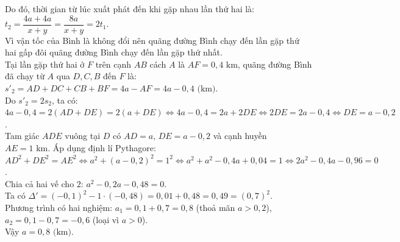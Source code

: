 \begin{bt}
{\begin{enumerate}[a)]
	Do đó, thời gian từ lúc xuất phát đến khi gặp nhau lần thứ hai là:
	$t_2 = \dfrac{4a + 4a}{x + y} = \dfrac{8a}{x + y} = 2t_1$.\\
	Vì vận tốc của Bình là không đổi nên quãng đường Bình chạy đến lần gặp thứ hai gấp đôi quãng đường Bình chạy đến lần gặp thứ nhất.\\
	Tại lần gặp thứ hai ở $F$ trên cạnh $AB$ cách $A$ là $AF = 0{,}4\text{ km}$, quãng đường Bình đã chạy từ $A$ qua $D, C, B$ đến $F$ là:
	$s'_2 = AD + DC + CB + BF = 4a - AF = 4a - 0{,}4\text{ (km)}$.\\
	Do $s'_2 = 2s_2$, ta có:
	$4a - 0{,}4 = 2(AD + DE) = 2(a + DE) \Leftrightarrow 4a - 0{,}4 = 2a + 2DE \Leftrightarrow 2DE = 2a - 0{,}4 \Leftrightarrow DE = a - 0{,}2$.\\
	Tam giác $ADE$ vuông tại $D$ có $AD = a$, $DE = a - 0{,}2$ và cạnh huyền $AE = 1\text{ km}$. Áp dụng định lí Pythagore:
	$AD^2 + DE^2 = AE^2 \Leftrightarrow a^2 + (a - 0{,}2)^2 = 1^2 \Leftrightarrow a^2 + a^2 - 0{,}4a + 0{,}04 = 1 \Leftrightarrow 2a^2 - 0{,}4a - 0{,}96 = 0$.\\
	Chia cả hai vế cho $2$: $a^2 - 0{,}2a - 0{,}48 = 0$.\\
	Ta có $\Delta' = (-0{,}1)^2 - 1\cdot(-0{,}48) = 0{,}01 + 0{,}48 = 0{,}49 = (0{,}7)^2$.\\
	Phương trình có hai nghiệm:
	$a_1 = 0{,}1 + 0{,}7 = 0{,}8$ (thoả mãn $a > 0{,}2$),\\
	$a_2 = 0{,}1 - 0{,}7 = -0{,}6$ (loại vì $a > 0$).\\
	Vậy $a = 0{,}8\text{ (km)}$.
\end{enumerate}
}
\end{bt}

